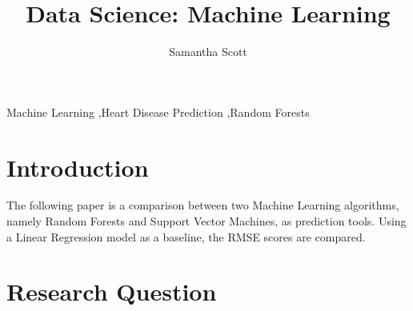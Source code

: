 \documentclass[11pt,preprint, authoryear]{elsarticle}
\numberwithin{equation}{section}
\numberwithin{figure}{section}
\numberwithin{table}{section}
\begin{document}
\begin{frontmatter}  %

\title{Data Science: Machine Learning}





\author[Add1]{Samantha Scott}





\address[Add1]{Stellenbosch University, Cape Town, South Africa}



\vspace{1cm}


\begin{keyword}
\footnotesize{
Machine Learning \sep Heart Disease Prediction \sep Random Forests \\
\vspace{0.3cm}
}
\end{keyword}



\vspace{0.5cm}

\end{frontmatter}


\newpage
\renewcommand{\contentsname}{Table of Contents}
{\tableofcontents}
\newpage

\pagestyle{fancy}
\chead{}
\lfoot{}
\lhead{}
\cfoot{}


\headsep 35pt %




\hypertarget{introduction}{%
\section{Introduction}\label{introduction}}

The following paper is a comparison between two Machine Learning
algorithms, namely Random Forests and Support Vector Machines, as
prediction tools. Using a Linear Regression model as a baseline, the
RMSE scores are compared.

\hypertarget{research-question}{%
\section{Research Question}\label{research-question}}
\end{document}
